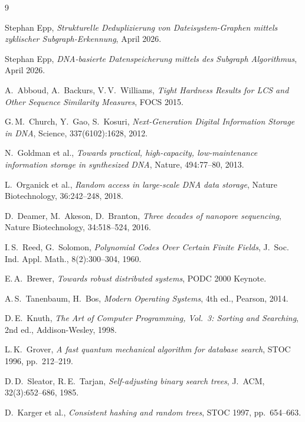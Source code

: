 ﻿\documentclass[a4paper,12pt]{article}
\theoremstyle{definition}
\theoremstyle{plain}
\begin{document}
\begin{thebibliography}{9}

  Stephan Epp,
  \textit{Strukturelle Deduplizierung von Dateisystem-Graphen mittels
  zyklischer Subgraph-Erkennung},
  April 2026.

  Stephan Epp,
  \textit{DNA-basierte Datenspeicherung mittels des Subgraph Algorithmus},
  April 2026.

  A.~Abboud, A.~Backurs, V.\,V.~Williams,
  \textit{Tight Hardness Results for LCS and Other Sequence Similarity
  Measures},
  FOCS 2015.

  G.\,M.~Church, Y.~Gao, S.~Kosuri,
  \textit{Next-Generation Digital Information Storage in DNA},
  Science, 337(6102):1628, 2012.

  N.~Goldman et al.,
  \textit{Towards practical, high-capacity, low-maintenance information
  storage in synthesized DNA},
  Nature, 494:77--80, 2013.

  L.~Organick et al.,
  \textit{Random access in large-scale DNA data storage},
  Nature Biotechnology, 36:242--248, 2018.

  D.~Deamer, M.~Akeson, D.~Branton,
  \textit{Three decades of nanopore sequencing},
  Nature Biotechnology, 34:518--524, 2016.

  I.\,S.~Reed, G.~Solomon,
  \textit{Polynomial Codes Over Certain Finite Fields},
  J.~Soc. Ind. Appl. Math., 8(2):300--304, 1960.

  E.\,A.~Brewer,
  \textit{Towards robust distributed systems},
  PODC 2000 Keynote.

  A.\,S.~Tanenbaum, H.~Bos,
  \textit{Modern Operating Systems}, 4th ed.,
  Pearson, 2014.

  D.\,E.~Knuth,
  \textit{The Art of Computer Programming, Vol.~3: Sorting and Searching},
  2nd ed., Addison-Wesley, 1998.

  L.\,K.~Grover,
  \textit{A fast quantum mechanical algorithm for database search},
  STOC 1996, pp.~212--219.

  D.\,D.~Sleator, R.\,E.~Tarjan,
  \textit{Self-adjusting binary search trees},
  J.~ACM, 32(3):652--686, 1985.

  D.~Karger et al.,
  \textit{Consistent hashing and random trees},
  STOC 1997, pp.~654--663.


\end{thebibliography}
\end{document}
